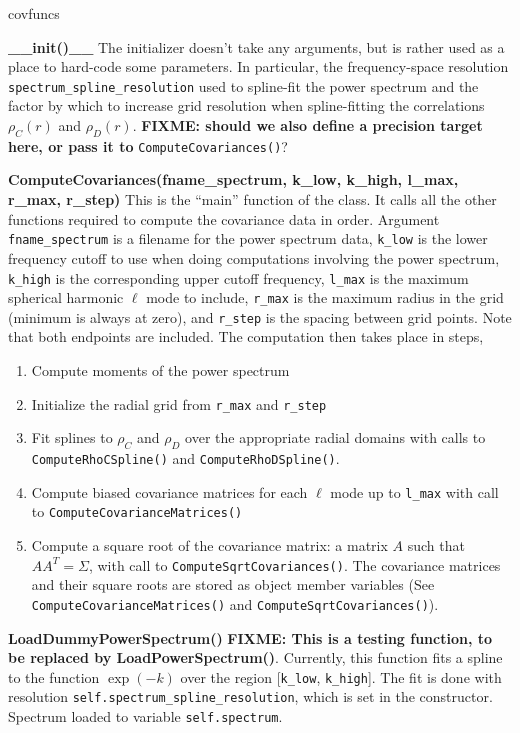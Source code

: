 \documentclass[10pt,a4paper]{article}
\begin{document}
\begin{labeling}{covfuncs}
	\item [\textbf{\_\_init()\_\_}] The initializer doesn't take any arguments, but is rather used as a place to hard-code some parameters. In particular, the frequency-space resolution \verb|spectrum_spline_resolution| used to spline-fit the power spectrum and the factor by which to increase grid resolution when spline-fitting the correlations $\rho_C(r)$ and $\rho_D(r)$. \textbf{FIXME: should we also define a precision target here, or pass it to} \verb|ComputeCovariances()|?
	\item [\textbf{ComputeCovariances(fname\_spectrum, k\_low, k\_high, l\_max, r\_max, r\_step)}] This is the ``main'' function of the class. It calls all the other functions required to compute the covariance data in order. Argument \verb|fname_spectrum| is a filename for the power spectrum data, \verb|k_low| is the lower frequency cutoff to use when doing computations involving the power spectrum, \verb|k_high| is the corresponding upper cutoff frequency, \verb|l_max| is the maximum spherical harmonic $\ell$ mode to include, \verb|r_max| is the maximum radius in the grid (minimum is always at zero), and \verb|r_step| is the spacing between grid points. Note that both endpoints are included.
	The computation then takes place in steps,
	\begin{enumerate}
		\item Compute moments of the power spectrum
		\item Initialize the radial grid from \verb|r_max| and \verb|r_step|
		\item Fit splines to $\rho_C$ and $\rho_D$ over the appropriate radial domains with calls to \verb|ComputeRhoCSpline()| and \verb|ComputeRhoDSpline()|.
		\item Compute biased covariance matrices for each $\ell$ mode up to \verb|l_max| with call to \verb|ComputeCovarianceMatrices()|
		\item Compute a square root of the covariance matrix: a matrix $A$ such that $AA^T = \Sigma$, with call to \verb|ComputeSqrtCovariances()|.
	The covariance matrices and their square roots are stored as object member variables (See \verb|ComputeCovarianceMatrices()| and \verb|ComputeSqrtCovariances()|).
	\end{enumerate}

	\item[\textbf{LoadDummyPowerSpectrum()}] \textbf{FIXME: This is a testing function, to be replaced by LoadPowerSpectrum()}.
	Currently, this function fits a spline to the function $\exp(-k)$ over the region [\verb|k_low|, \verb|k_high|]. The fit is done with resolution \verb|self.spectrum_spline_resolution|, which is set in the constructor. Spectrum loaded to variable \verb|self.spectrum|.
	

\end{labeling}
\end{document}

